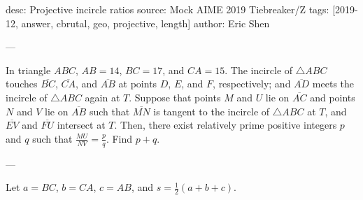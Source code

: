 desc: Projective incircle ratios
source: Mock AIME 2019 Tiebreaker/Z
tags: [2019-12, answer, cbrutal, geo, projective, length]
author: Eric Shen

---

In triangle $ABC$, $AB=14$, $BC=17$, and $CA=15$. The incircle of $\triangle ABC$ touches $\overline{BC}$, $\overline{CA}$, and $\overline{AB}$ at points $D$, $E$, and $F$, respectively; and $\overline{AD}$ meets the incircle of $\triangle ABC$ again at $T$. Suppose that points $M$ and $U$ lie on $\overline{AC}$ and points $N$ and $V$ lie on $\overline{AB}$ such that $\overline{MN}$ is tangent to the incircle of $\triangle ABC$ at $T$, and $\overline{EV}$ and $\overline{FU}$ intersect at $T$. Then, there exist relatively prime positive integers $p$ and $q$ such that $\tfrac{MU}{NV}=\tfrac pq$. Find $p+q$.

---

Let $a=BC$, $b=CA$, $c=AB$, and $s=\tfrac12(a+b+c)$.

